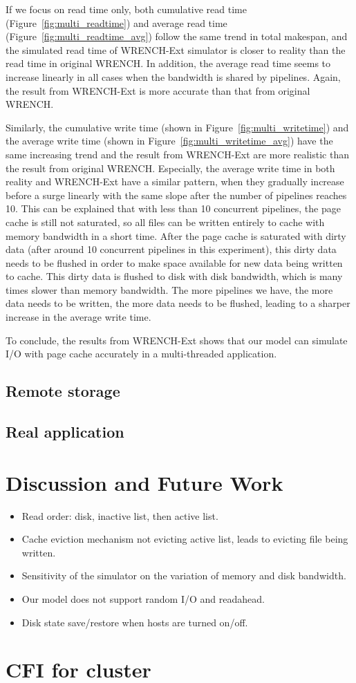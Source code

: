 \documentclass[conference]{IEEEtran}
\begin{document}
			If we focus on read time only, both cumulative read time (Figure~\ref{fig:multi_readtime}) 
			and average read time (Figure~\ref{fig:multi_readtime_avg}) 
			follow the same trend in total makespan, and the simulated read time 
			of WRENCH-Ext simulator is closer to reality than the read time in original WRENCH. 
			In addition, the average read time seems to increase linearly in all cases when 
			the bandwidth is shared by pipelines. Again, the result from WRENCH-Ext is more 
			accurate than that from original WRENCH. 
			
			Similarly, the cumulative write time (shown in Figure~\ref{fig:multi_writetime}) 
			and the average write time (shown in Figure~\ref{fig:multi_writetime_avg}) have 
			the same increasing trend and the result from WRENCH-Ext are more realistic than 
			the result from original WRENCH. 
			Especially, the average write time in both reality and WRENCH-Ext have a similar 
			pattern, when they gradually increase before a surge linearly with the same slope 
			after the number of pipelines reaches 10. 
			This can be explained that with less than 10 concurrent pipelines, the page cache 
			is still not saturated, so all files can be written entirely to cache with memory 
			bandwidth in a short time. 
			After the page cache is saturated with dirty data (after around 10 concurrent pipelines 
			in this experiment), this dirty data needs to be flushed in order to make space 
			available for new data being written to cache. This dirty data is flushed to 
			disk with disk bandwidth, which is many times slower than memory bandwidth. 
			The more pipelines we have, the more data needs to be written, the more data 
			needs to be flushed, leading to a sharper increase in the average write time. 
			
			To conclude, the results from WRENCH-Ext shows that our model can simulate I/O 
			with page cache accurately in a multi-threaded application.  
			
		\subsection{Remote storage}
		
		\subsection{Real application}


	\section{Discussion and Future Work}
		\begin{itemize}
			\item Read order: disk, inactive list, then active list. 
			\item Cache eviction mechanism not evicting active list, leads to evicting file being written.
			\item Sensitivity of the simulator on the variation of memory and disk bandwidth. 
			\item Our model does not support random I/O and readahead.
			\item Disk state save/restore when hosts are turned on/off.
		\end{itemize}
	\section{CFI for cluster}


\end{document}
